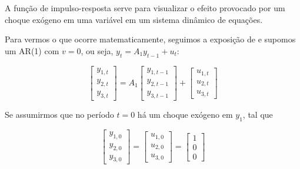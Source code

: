 \documentclass[a4paper,
               article,
               12pt,
               openany,
               oneside,
               english,
               brazil]{abntex2}
\numberwithin{equation}{section}
\begin{document}
    A função de impulso-resposta serve para visualizar o efeito provocado por um choque exógeno em uma variável em um sistema dinâmico de equações.

    Para vermos o que ocorre matematicamente, seguimos a exposição de  e supomos um AR(1) com $ v = 0 $, ou seja, $ y_t = A_1 y_{t-1} + u_t $:

    \begin{equation*}
        \label{impulse-response}
        \begin{bmatrix}
            y_{1,t} \\
            y_{2,t} \\
            y_{3,t}
        \end{bmatrix} =
        A_1
        \begin{bmatrix}
            y_{1,t-1} \\
            y_{2,t-1} \\
            y_{3,t-1}
        \end{bmatrix} +
        \begin{bmatrix}
            u_{1,t} \\
            u_{2,t} \\
            u_{3,t}
        \end{bmatrix}
    \end{equation*}

    Se assumirmos que no período $ t = 0 $ há um choque exógeno em $ y_1 $, tal que

    \begin{equation*}
        \label{impulse-response}
        \begin{bmatrix}
            y_{1,0} \\
            y_{2,0} \\
            y_{3,0}
        \end{bmatrix} =
        \begin{bmatrix}
            u_{1,0} \\
            u_{2,0} \\
            u_{3,0}
        \end{bmatrix} =
        \begin{bmatrix}
            1 \\
            0 \\
            0
        \end{bmatrix}
    \end{equation*}
\end{document}
